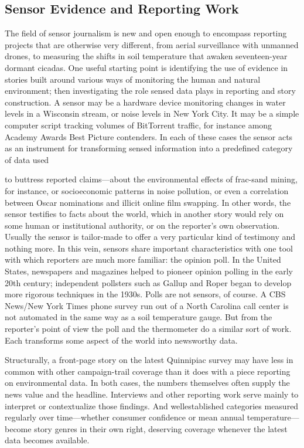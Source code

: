 \begin{itemize}
\begin{itemized}
\section{Sensor Evidence and Reporting Work}
The field of sensor journalism is new and open enough to encompass
reporting projects that are otherwise very different, from aerial surveillance
with unmanned drones, to measuring the shifts in soil temperature that
awaken seventeen-year dormant cicadas. One useful starting point is identifying
the use of evidence in stories built around various ways of monitoring
the human and natural environment; then investigating the role sensed
data plays in reporting and story construction. A sensor may be a hardware
device monitoring changes in water levels in a Wisconsin stream, or noise
levels in New York City. It may be a simple computer script tracking volumes
of BitTorrent traffic, for instance among Academy Awards Best Picture
contenders. In each of these cases the sensor acts as an instrument for
transforming sensed information into a predefined category of data used

to buttress reported claims—about the environmental effects of frac-sand
mining, for instance, or socioeconomic patterns in noise pollution, or even
a correlation between Oscar nominations and illicit online film swapping.
In other words, the sensor testifies to facts about the world, which in
another story would rely on some human or institutional authority, or on
the reporter's own observation. Usually the sensor is tailor-made to offer
a very particular kind of testimony and nothing more. In this vein, sensors
share important characteristics with one tool with which reporters are
much more familiar: the opinion poll. In the United States, newspapers and
magazines helped to pioneer opinion polling in the early 20th century; independent
pollsters such as Gallup and Roper began to develop more rigorous
techniques in the 1930s. Polls are not sensors, of course. A CBS News/New
York Times phone survey run out of a North Carolina call center is not automated
in the same way as a soil temperature gauge. But from the reporter's
point of view the poll and the thermometer do a similar sort of work. Each
transforms some aspect of the world into newsworthy data.

Structurally, a front-page story on the latest Quinnipiac survey may have
less in common with other campaign-trail coverage than it does with a piece
reporting on environmental data. In both cases, the numbers themselves
often supply the news value and the headline. Interviews and other reporting
work serve mainly to interpret or contextualize those findings. And wellestablished
categories measured regularly over time—whether consumer
confidence or mean annual temperature—become story genres in their own
right, deserving coverage whenever the latest data becomes available.


\end{itemized}
\end{itemize}

